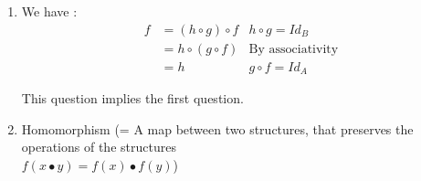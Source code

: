\documentclass{article}
\theoremstyle{plain}
\begin{document}
\begin{enumerate}
    \item We have :
      \begin{align*}
        f &= (h \circ g) \circ f & h \circ g = Id_B \\
          &= h \circ (g \circ f) & \text{By associativity} \\
          &= h & g \circ f = Id_A
      \end{align*}

      This question implies the first question.

    \item Homomorphism (= A map between two structures, that preserves the
      operations of the structures \\
      $f(x \bullet y) = f(x) \bullet f(y)$)
  \end{enumerate}
\end{document}
